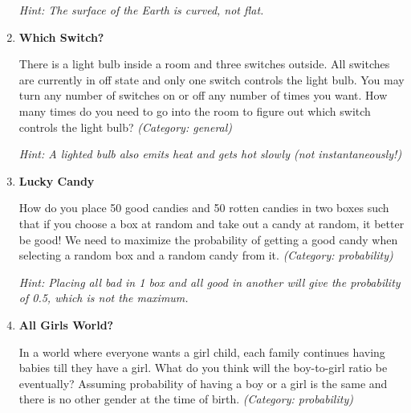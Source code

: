 \begin{enumerate}
\small\emph{Hint: The surface of the Earth is curved, not flat.}





\item \textbf{Which Switch?}

There is a light bulb inside a room and three switches outside. All switches are currently in off state and only one switch controls the light bulb. You may turn any number of switches on or off any number of times you want. How many times do you need to go into the room to figure out which switch controls the light bulb?
\small\emph{(Category: general)}

\small\emph{Hint: A lighted bulb also emits heat and gets hot slowly (not instantaneously!)}





\item \textbf{Lucky Candy}

How do you place 50 good candies and 50 rotten candies in two boxes such that if you choose a box at random and take out a candy at random, it better be good!
We need to maximize the probability of getting a good candy when selecting a random box and a random candy from it.
\small\emph{(Category: probability)}

\small\emph{Hint: Placing all bad in 1 box and all good in another will give the probability of 0.5, which is not the maximum.}





\item \textbf{All Girls World?}

In a world where everyone wants a girl child, each family continues having babies till they have a girl. What do you think will the boy-to-girl ratio be eventually?
Assuming probability of having a boy or a girl is the same and there is no other gender at the time of birth.
\small\emph{(Category: probability)}




\end{enumerate}
